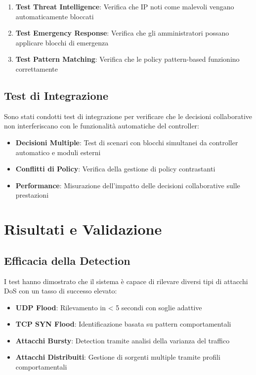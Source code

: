 \begin{enumerate}
    \item \textbf{Test Threat Intelligence}: Verifica che IP noti come malevoli vengano automaticamente bloccati
    \item \textbf{Test Emergency Response}: Verifica che gli amministratori possano applicare blocchi di emergenza
    \item \textbf{Test Pattern Matching}: Verifica che le policy pattern-based funzionino correttamente
\end{enumerate}

\subsection{Test di Integrazione}
Sono stati condotti test di integrazione per verificare che le decisioni collaborative non interferiscano con le funzionalità automatiche del controller:

\begin{itemize}
    \item \textbf{Decisioni Multiple}: Test di scenari con blocchi simultanei da controller automatico e moduli esterni
    \item \textbf{Conflitti di Policy}: Verifica della gestione di policy contrastanti
    \item \textbf{Performance}: Misurazione dell'impatto delle decisioni collaborative sulle prestazioni
\end{itemize}

\section{Risultati e Validazione}

\subsection{Efficacia della Detection}
I test hanno dimostrato che il sistema è capace di rilevare diversi tipi di attacchi DoS con un tasso di successo elevato:
\begin{itemize}
    \item \textbf{UDP Flood}: Rilevamento in < 5 secondi con soglie adattive
    \item \textbf{TCP SYN Flood}: Identificazione basata su pattern comportamentali
    \item \textbf{Attacchi Bursty}: Detection tramite analisi della varianza del traffico
    \item \textbf{Attacchi Distribuiti}: Gestione di sorgenti multiple tramite profili comportamentali
\end{itemize}

